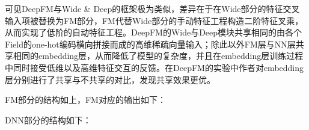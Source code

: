 可见DeepFM与Wide \& Deep的框架极为类似，差异在于在Wide部分的特征交叉输入项被替换为FM部分，FM代替Wide部分的手动特征工程构造二阶特征叉乘，从而实现了低阶的自动特征工程。DeepFM的Wide与Deep模块共享相同的由各个Field的one-hot编码横向拼接而成的高维稀疏向量输入；除此以外FM层与NN层共享相同的embedding层，从而降低了模型的复杂度，并且在embedding层训练过程中同时接受低维以及高维特征交互的反馈。在DeepFM的实验中作者对embedding层分别进行了共享与不共享的对比，发现共享效果更优。





FM部分的结构如上，FM对应的输出如下：





DNN部分的结构如下：


